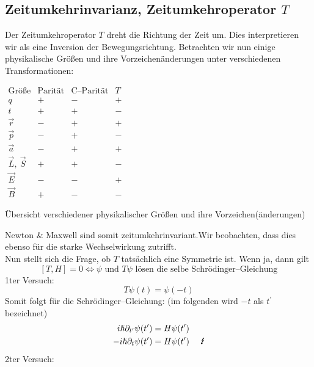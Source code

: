 \documentclass[Ex4_Zusammenfassung.tex]{subfiles}
\begin{document}
\subsection{Zeitumkehrinvarianz, Zeitumkehroperator $T$}
Der Zeitumkehroperator $T$ dreht die Richtung der Zeit um. Dies interpretieren wir als eine Inversion der Bewegungsrichtung. Betrachten wir nun einige physikalische Größen und ihre Vorzeichenänderungen unter verschiedenen Transformationen:
\begin{table}[H]
	\centering
	$
	\begin{array}{cccc}
	\text{Größe} & \text{Parität} & \text{C--Parität} & T \\ \hline
	q & + & - & + \\ 
	t & + & + & - \\ 
	\vec{r} & - & + & + \\ 
	\vec{p} & - & + & - \\ 
	\vec{a} & - & + & + \\ 
	\vec{L},\ \vec{S} & + & + & - \\ 
	\vec{E} & - & - & + \\ 
	\vec{B} & + & - & -
	\end{array}  
	$
	\caption{Übersicht verschiedener physikalischer Größen und ihre Vorzeichen(änderungen)}
\end{table}
Newton \& Maxwell sind somit zeitumkehrinvariant.Wir beobachten, dass dies ebenso für die starke Wechselwirkung zutrifft.\\

Nun stellt sich die Frage, ob $T$ tatsächlich eine Symmetrie ist. Wenn ja, dann gilt
\begin{equation}
	\left[ T,H\right] =0 \Leftrightarrow \psi \text{ und } T \psi \text{ lösen die selbe Schrödinger--Gleichung}
\end{equation}
1ter Versuch: 
\begin{equation}
	T\psi(t) = \psi(-t)
\end{equation}
Somit folgt für die Schrödinger--Gleichung: (im folgenden wird $-t$ als $t^\prime$ bezeichnet)
\begin{align}
	i \hslash \partial_{t^\prime} \psi(t^\prime) &= H\psi(t^\prime)\\
	-i \hslash \partial_t \psi(t^\prime) &= H\psi(t^\prime)\ \quad \text{\Lightning}
\end{align}
2ter Versuch: 
\end{document}
